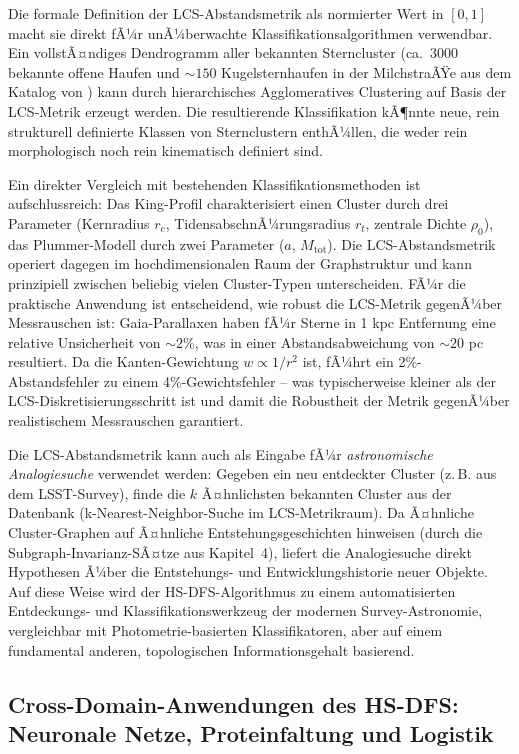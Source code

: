 ﻿\documentclass[a4paper,12pt]{report}
\theoremstyle{definition}
\begin{document}
Die formale Definition der LCS-Abstandsmetrik als normierter Wert in $[0,1]$ macht sie direkt fÃ¼r unÃ¼berwachte Klassifikationsalgorithmen verwendbar. Ein vollstÃ¤ndiges Dendrogramm aller bekannten Sterncluster (ca.\ 3000 bekannte offene Haufen und $\sim 150$ Kugelsternhaufen in der MilchstraÃŸe aus dem Katalog von \cite{harris1996}) kann durch hierarchisches Agglomeratives Clustering auf Basis der LCS-Metrik erzeugt werden. Die resultierende Klassifikation kÃ¶nnte neue, rein strukturell definierte Klassen von Sternclustern enthÃ¼llen, die weder rein morphologisch noch rein kinematisch definiert sind.

Ein direkter Vergleich mit bestehenden Klassifikationsmethoden ist aufschlussreich: Das King-Profil charakterisiert einen Cluster durch drei Parameter (Kernradius $r_c$, TidensabschnÃ¼rungsradius $r_t$, zentrale Dichte $\rho_0$), das Plummer-Modell durch zwei Parameter ($a$, $M_\mathrm{tot}$). Die LCS-Abstandsmetrik operiert dagegen im hochdimensionalen Raum der Graphstruktur und kann prinzipiell zwischen beliebig vielen Cluster-Typen unterscheiden. FÃ¼r die praktische Anwendung ist entscheidend, wie robust die LCS-Metrik gegenÃ¼ber Messrauschen ist: Gaia-Parallaxen haben fÃ¼r Sterne in 1 kpc Entfernung eine relative Unsicherheit von $\sim 2\%$, was in einer Abstandsabweichung von $\sim 20$ pc resultiert. Da die Kanten-Gewichtung $w \propto 1/r^2$ ist, fÃ¼hrt ein 2\%-Abstandsfehler zu einem 4\%-Gewichtsfehler -- was typischerweise kleiner als der LCS-Diskretisierungsschritt ist und damit die Robustheit der Metrik gegenÃ¼ber realistischem Messrauschen garantiert.

Die LCS-Abstandsmetrik kann auch als Eingabe fÃ¼r \emph{astronomische Analogiesuche} verwendet werden: Gegeben ein neu entdeckter Cluster (z.\,B. aus dem LSST-Survey), finde die $k$ Ã¤hnlichsten bekannten Cluster aus der Datenbank (k-Nearest-Neighbor-Suche im LCS-Metrikraum). Da Ã¤hnliche Cluster-Graphen auf Ã¤hnliche Entstehungsgeschichten hinweisen (durch die Subgraph-Invarianz-SÃ¤tze aus Kapitel~4), liefert die Analogiesuche direkt Hypothesen Ã¼ber die Entstehungs- und Entwicklungshistorie neuer Objekte. Auf diese Weise wird der HS-DFS-Algorithmus zu einem automatisierten Entdeckungs- und Klassifikationswerkzeug der modernen Survey-Astronomie, vergleichbar mit Photometrie-basierten Klassifikatoren, aber auf einem fundamental anderen, topologischen Informationsgehalt basierend.

\subsection{Cross-Domain-Anwendungen des HS-DFS: Neuronale Netze, Proteinfaltung und Logistik}
\end{document}
